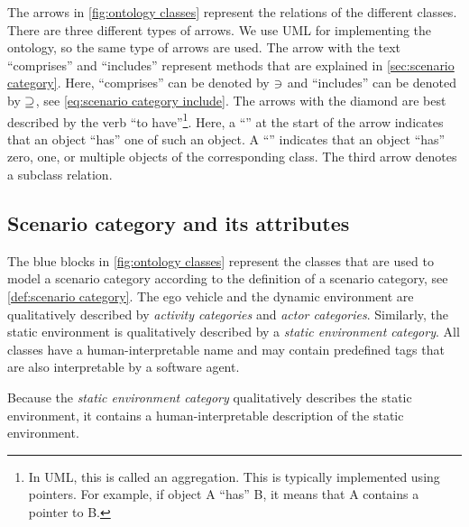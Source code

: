 The arrows in \cref{fig:ontology classes} represent the relations of the different classes. 
There are three different types of arrows. 
We use UML for implementing the ontology, so the same type of arrows are used.
\cstart The arrow with the text ``comprises'' and ``includes'' represent methods that are explained in \cref{sec:scenario category}. Here, ``comprises'' can be denoted by $\ni$ and ``includes'' can be denoted by $\supseteq$, see \cref{eq:scenario category include}. \cend
The arrows with the diamond are best described by the verb ``to have''\footnote{In UML, this is called an aggregation.  This is typically implemented using pointers. For example, if object A ``has'' B, it means that A contains a pointer to B.}. \cstart Here, a ``\hasone'' at the start of the arrow indicates that an object ``has'' one of such an object. A ``\hasn'' indicates that an object ``has'' zero, one, or multiple objects of the corresponding class. \cend The third arrow denotes a subclass relation. 



\subsection{Scenario category and its attributes}
\label{sec:domain scenario category}

The blue blocks in \cref{fig:ontology classes} represent the classes that are used to model a scenario category according to the definition of a scenario category, see \cref{def:scenario category}. 
The ego vehicle and the dynamic environment are qualitatively described by \textit{activity categories} and \textit{actor categories}. Similarly, the static environment is qualitatively described by a \textit{static environment category}. \cstart All classes have a human-interpretable name and may contain predefined tags that are also interpretable by a software agent.\cend

Because the \textit{static environment category} qualitatively describes the static environment, it contains a human-interpretable description of the static environment.

